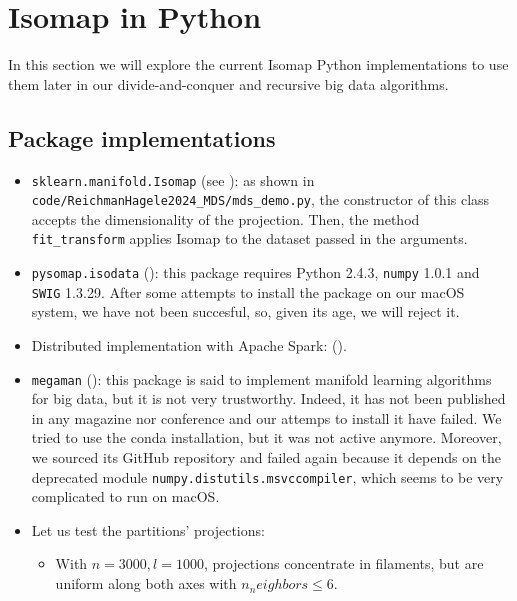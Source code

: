 \documentclass[a4paper,12pt]{article}
\begin{document}
\pagebreak
\section{Isomap in Python}

In this section we will explore the current Isomap Python implementations to use them later in our divide-and-conquer and recursive big data algorithms.

\subsection{Package implementations}

\begin{itemize}
    \item \texttt{sklearn.manifold.Isomap} (see \cite{Pedregosa2011}): as shown in  \nolinkurl{code/ReichmanHagele2024_MDS/mds_demo.py}, the constructor of this class accepts the dimensionality of the projection.  Then, the method \nolinkurl{fit_transform} applies Isomap to the dataset passed in the arguments.

    \item \texttt{pysomap.isodata} (\cite{Spiwokv2007}): this package requires Python 2.4.3, \texttt{numpy} 1.0.1 and \texttt{SWIG} 1.3.29. After some attempts to install the package on our macOS system, we have not been succesful, so, given its age, we will reject it.

    \item Distributed implementation with Apache Spark: (\cite{Schoeneman2018}).

    \item \texttt{megaman} (\cite{Mcqueen2016}): this package is said to implement manifold learning algorithms for big data, but it is not very trustworthy. Indeed, it has not been published in any magazine nor conference and our attemps to install it have failed. We tried to use the conda installation, but it was not active anymore. Moreover, we sourced its GitHub repository and failed again because it depends on the deprecated module \texttt{numpy.distutils.msvccompiler}, which seems to be very complicated to run on macOS.
    \item Let us test the partitions' projections:
    \begin{itemize}
        \item With $n=3000, l=1000$, projections concentrate in filaments, but are uniform along both axes with $n_neighbors \leq 6$. 
    \end{itemize}
\end{itemize}
\end{document}
